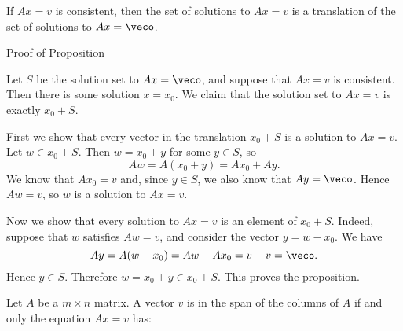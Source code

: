 \endedxproblem


\endedxvertical





{}  If $Ax = v$ is consistent, then the set of solutions to $Ax = v$ is a translation
of the set of solutions to $Ax = \veco$.   

\begin{edXshowhide}{Proof of Proposition}

Let $S$ be the solution set to $Ax = \veco$, and 
suppose that $Ax = v$ is consistent.  Then there is some solution $x=x_0$. We claim that the solution set to 
$Ax = v$ is exactly $x_0 + S$.  

First we show that every vector in the translation $x_0 + S$ is a solution to $Ax=v.$  Let $w \in x_0+S$.  Then
$w = x_0 + y$ for some $y \in S$, so 
\[ Aw = A(x_0 + y) = Ax_0 + Ay.\]
We know that $Ax_0 = v$ and, since $y \in S$, we also know that $Ay = \veco$.  Hence $Aw = v$, so $w$ 
is a solution to $Ax = v.$  

Now we show that every solution to $Ax = v$ is an element of $x_0 + S.$   Indeed, suppose that 
$w$ satisfies $Aw = v$, and consider the vector $y = w-x_0.$  We have
\[Ay = A(w-x_0) = Aw - Ax_0 = v-v = \veco.\]
Hence $y \in S$.  Therefore $w = x_0 + y \in x_0 + S.$  This proves the proposition.  

\end{edXshowhide}


\endedxtext

\endedxvertical








     

Let $A$ be a $m\times n$ matrix.  A vector $v$ is in the span of the columns of $A$ if and only 
the equation $Ax = v$ has:  




